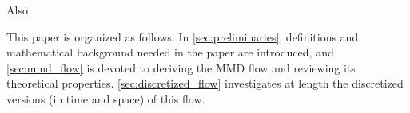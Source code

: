 Also


This paper is organized as follows. In \cref{sec:preliminaries}, definitions and mathematical background needed in the paper are introduced, and \cref{sec:mmd_flow} is devoted to deriving the MMD flow and reviewing its theoretical properties. 
\cref{sec:discretized_flow} investigates at length the discretized versions (in time and space) of this flow. 